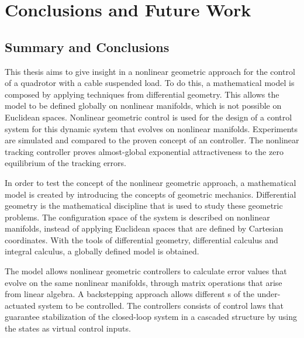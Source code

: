 \chapter{Conclusions and Future Work}\label{ch:conclusion}
\section{Summary and Conclusions}

This thesis aims to give insight in a nonlinear geometric approach for the control of a quadrotor with a cable suspended load. 
To do this, a mathematical model is composed by applying techniques from differential geometry. 
This allows the model to be defined globally on nonlinear manifolds, which is not possible on Euclidean spaces.
Nonlinear geometric control is used for the design of a control system for this dynamic system that evolves on nonlinear manifolds.
Experiments are simulated and compared to the proven concept of an  controller.
The nonlinear tracking controller proves almost-global exponential attractiveness to the zero equilibrium of the tracking errors. 

In order to test the concept of the nonlinear geometric approach, a mathematical model is created by introducing the concepts of geometric mechanics. 
Differential geometry is the mathematical discipline that is used to study these geometric problems.
The configuration space of the system is described on nonlinear manifolds, instead of applying Euclidean spaces that are defined by Cartesian coordinates.
With the tools of differential geometry, differential calculus and integral calculus, a globally defined model is obtained.

The model allows nonlinear geometric controllers to calculate error values that evolve on the same nonlinear manifolds, through matrix operations that arise from linear algebra. 
A backstepping approach allows different s of the under-actuated system to be controlled.
The controllers consists of control laws that guarantee stabilization of the closed-loop system in a cascaded structure by using the states as virtual control inputs. 
%
%


